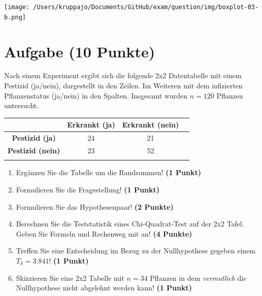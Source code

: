 \documentclass[a4paper, 10pt]{scrartcl}\usepackage[]{graphicx}\usepackage[]{xcolor}
\begin{document}
\vspace*{8cm}

\begin{center}
  \texttt{[image: /Users/kruppajo/Documents/GitHub/exam/question/img/boxplot-03-b.png]}
\end{center}



 
\clearpage

\section{Aufgabe \hfill (10 Punkte)}



Nach einem Experiment ergibt sich die folgende 2x2 Datentabelle mit einem
Pestizid (ja/nein), dargestellt in den Zeilen. Im Weiteren mit dem
infizierten Pflanzenstatus (ja/nein) in den Spalten. Insgesamt wurden
$n = 120$ Pflanzen untersucht.
\vspace{5Ex}

\begin{center}
  \Large
  \begin{tabular}{c|c|c|c}
     & \textbf{Erkrankt (ja)} & \textbf{Erkrankt (nein)} &  \strut\\
    \hline
    \textbf{Pestizid (ja)} & 24  & 21  &     \strut\\
    \hline
    \textbf{Pestizid (nein)} & 23  & 52  &      \strut\\
    \hline
     \phantom{100} & \phantom{100}  & \phantom{100}  &  \phantom{100}  \strut\\
  \end{tabular}
\end{center}

\vspace{5Ex}

\begin{enumerate}
\item Erg{\"a}nzen Sie die Tabelle um die Randsummen! \textbf{(1 Punkt)} 
\item Formulieren Sie die Fragestellung! \textbf{(1 Punkt)}
\item Formulieren Sie das Hypothesenpaar! \textbf{(2 Punkte)}
\item Berechnen Sie die Teststatistik eines Chi-Quadrat-Test auf der 2x2
  Tafel. Geben Sie Formeln und Rechenweg mit an! \textbf{(4 Punkte)}
\item Treffen Sie eine Entscheidung im Bezug zu der Nullhypothese gegeben
  einem $T_k = 3.841$! \textbf{(1 Punkt)}
\item Skizzieren Sie eine 2x2 Tabelle mit
  $n = 34$ Pflanzen in dem \textit{vermutlich}
  die Nullhypothese nicht abgelehnt werden kann! \textbf{(1 Punkt)}
\end{enumerate} 
\clearpage
\end{document}
